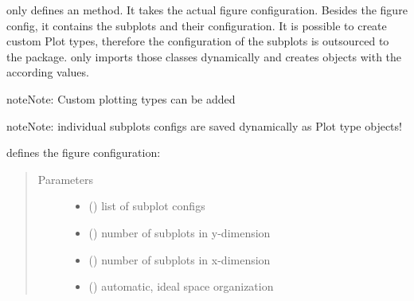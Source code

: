 \documentclass[letterpaper,10pt,english]{sphinxmanual}
\begin{document}
\begin{fulllineitems}
\begin{fulllineitems}
\begin{fulllineitems}
\begin{fulllineitems}
\label{\detokenize{DataAnalyzer.Data:DataAnalyzer.Data.cl_data.FileData.PlotData.Figure.FigConfig}}
 only defines an  method. It takes the actual figure configuration.
Besides the figure config, it contains the subplots and their configuration.
It is possible to create custom Plot types, therefore the configuration of the subplots is outsourced
to the  package.  only imports those classes dynamically and creates objects
with the according values.

\begin{sphinxadmonition}{note}{Note:}
Custom plotting types can be added
\end{sphinxadmonition}

\begin{sphinxadmonition}{note}{Note:}
individual subplots configs are saved dynamically as Plot type objects!
\end{sphinxadmonition}

 defines the figure configuration:
\begin{quote}\begin{description}
\item[{Parameters}] \leavevmode\begin{itemize}
\item {} 
 () \textendash{} list of subplot configs

\item {} 
 () \textendash{} number of subplots in y-dimension

\item {} 
 () \textendash{} number of subplots in x-dimension

\item {} 
 () \textendash{} automatic, ideal space organization


\end{itemize}
\end{description}
\end{quote}
\end{fulllineitems}
\end{fulllineitems}
\end{fulllineitems}
\end{fulllineitems}
\end{document}
